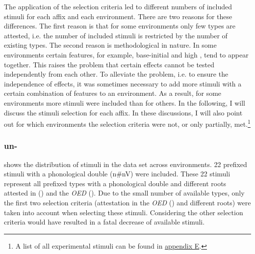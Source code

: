  

The application of the selection criteria led to different numbers of included stimuli for each affix and each environment. 
There are two reasons for these differences. The first reason is that for some environments only few types are attested, i.e. the number of included stimuli is restricted by the number of existing types. The second reason is methodological in nature. 
In some environments 
certain features, for example, base-initial  and high , tend to appear together. This raises the problem that certain effects cannot be tested independently from each other. To alleviate the problem, i.e. to ensure the independence of effects, it was sometimes necessary to add more stimuli with a certain combination of features to an environment. As a result, for some environments more stimuli were included than for others. 
In the following, I will discuss the stimuli selection for each affix. In these discussions, I will also point out for which environments the selection criteria were not, or only partially, met.\footnote{A list of all experimental stimuli can be found in \hyperref[Appendix E: Stimuli of Experimental Study]{appendix E}.} 


\subsubsection{un-}

 shows the distribution of  stimuli in the data set across environments. 
22  prefixed stimuli with a phonological double ({n\#nV}) were included. These 22 stimuli represent all prefixed types with a phonological double and different roots attested in  (\citealt{Davies.20082014}) and the \textit{OED} (\citealt{OED.2013}). 
Due to the small number of available types, only the first two selection criteria (attestation in the \textit{OED} (\citealt{OED.2013}) and different roots) were taken into account when selecting these stimuli. Considering the other selection criteria would have resulted in a fatal decrease of available stimuli. 



